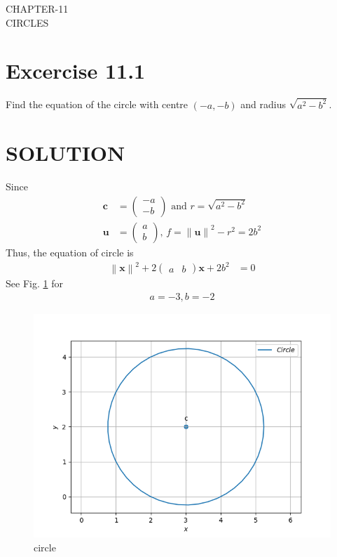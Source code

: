 \documentclass[12pt]{article}
\providecommand{\norm}[1]{\left\lVert#1\right\rVert}
\newcommand{\myvec}[1]{\ensuremath{\begin{pmatrix}#1\end{pmatrix}}}
\let\vec\mathbf
\begin{document}
\begin{center}
\textbf\large{CHAPTER-11 \\ CIRCLES}

\end{center}
\section{Excercise 11.1}
Find the equation of the circle with centre $(-a,-b)$ and radius $\sqrt{a^2-b^2}$.

\section{SOLUTION}
\fi
Since
\begin{align}
	\vec{c} &= \myvec{-a\\-b} \text{ and } r = \sqrt{a^2-b^2}
	\\
	\vec{u} &= \myvec{a\\b},\,
	f = \norm{\vec{u}}^2 - r^2
	  =2b^2
\end{align}
Thus, the equation of circle is 
\begin{align}
	\norm{\vec{x}}^2 +2 \myvec{a&b}\vec{x}+2b^2 &= 0       		       
\end{align}	
See Fig.
		\ref{fig:chapters/11/11/1/5/Figure} for 
\begin{align}
	a = -3, b = -2
\end{align} 
\begin{figure}[h]
\centering
\includegraphics[width=\columnwidth]{chapters/11/11/1/5/figs/circle.png}
\caption{circle}
		\label{fig:chapters/11/11/1/5/Figure}
\end{figure}
\end{document}
